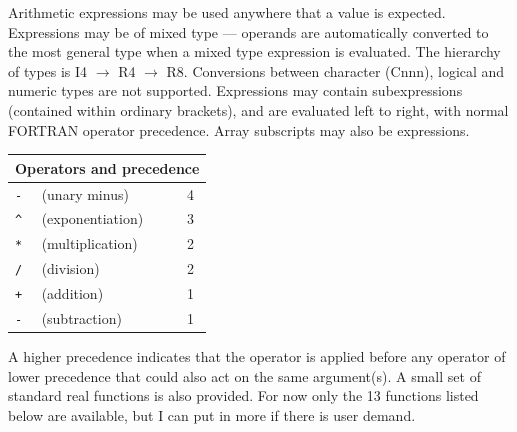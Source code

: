 \documentclass[11pt,twoside]{report}
\begin{document}
Arithmetic expressions may be used anywhere that a value is expected.
Expressions may be of mixed type --- operands
are automatically converted to the most general type when a mixed type
expression is evaluated. The hierarchy of types is
I4 $\rightarrow$ R4 $\rightarrow$ R8. Conversions between character (Cnnn),
logical and numeric types are not supported. Expressions may contain
subexpressions (contained within ordinary brackets), and
are evaluated left to right, with normal FORTRAN operator precedence. Array
subscripts may also be expressions.

\index{-}\index{*}\index{/}\index{+}
\begin{center}
\begin{tabular}{|lll|} \hline
\multicolumn{3}{|c|}{Operators and precedence}\\
\hline
\verb#-#  & (unary minus)   & 4 \\
\verb#^#  & (exponentiation)   & 3\\
\verb#*#  & (multiplication)   & 2\\
\verb#/#  & (division)   & 2\\
\verb#+#  & (addition)   & 1\\
\verb#-#  & (subtraction)   & 1 \\ \hline
\end{tabular}
\end{center}

A higher precedence indicates that the operator is applied before
any operator of lower precedence that could also act on the same argument(s).
A small set of standard real functions is also provided. For now only the 13
functions listed below are available, but I can put in more if there is
user demand.
\end{document}
